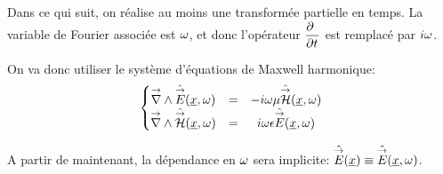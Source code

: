 Dans ce qui suit, on réalise au moins une transformée partielle en temps. La variable de Fourier associée est \(\w\), et donc l'opérateur \(\ddr{t}{~}\) est remplacé par \(i\w\).


On va donc utiliser le système d'équations de Maxwell harmonique:
\begin{equation}
    \left\lbrace 
    \begin{matrix}
    \vrot \hat \vE(\v{x},\w)  &=& -i \omega \mu \hat \vH(\v{x},\w)  \\
    \vrot \hat \vH(\v{x},\w)  &=& i \omega \eps \hat \vE(\v{x},\w) 
    \end{matrix}
    \right.
    \label{eq:imp_fourier:intro:maxwell_harmonique}
\end{equation}

A partir de maintenant, la dépendance en \(\w\) sera implicite: \(\hat \vE(\v x) \equiv \hat \vE (\v x, \w)\).